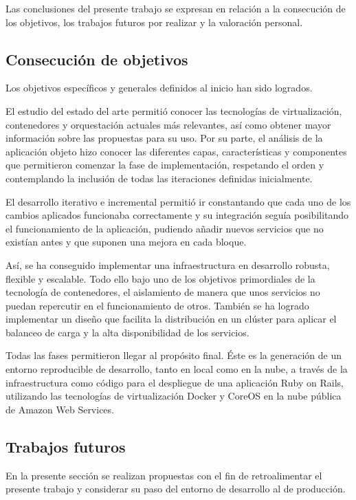 Las conclusiones del presente trabajo se expresan en relación a la consecución de los objetivos, los trabajos futuros por realizar y la valoración personal.

\subsection{Consecución de objetivos}

Los objetivos específicos y generales definidos al inicio han sido logrados.

El estudio del estado del arte permitió conocer las tecnologías de virtualización, contenedores y orquestación actuales más relevantes, así como obtener mayor información sobre las propuestas para su uso. Por su parte, el análisis de la aplicación objeto hizo conocer las diferentes capas, características y componentes que permitieron comenzar la fase de implementación, respetando el orden y contemplando la inclusión de todas las iteraciones definidas inicialmente. 

El desarrollo iterativo e incremental permitió ir constantando que cada uno de los cambios aplicados funcionaba correctamente y su integración seguía posibilitando el funcionamiento de la aplicación, pudiendo añadir nuevos servicios que no existían antes y que suponen una mejora en cada bloque.

Así, se ha conseguido implementar una infraestructura en desarrollo robusta, flexible y escalable. Todo ello bajo uno de los objetivos primordiales de la tecnología de contenedores, el aislamiento de manera que unos servicios no puedan repercutir en el funcionamiento de otros. También se ha logrado implementar un diseño que facilita la distribución en un clúster para aplicar el balanceo de carga y la alta disponibilidad de los servicios.

Todas las fases permitieron llegar al propósito final. Éste es la generación de un entorno reproducible de desarrollo, tanto en local como en la nube, a través de la infraestructura como código para el despliegue de una aplicación Ruby on Rails, utilizando las tecnologías de virtualización Docker y CoreOS en la nube pública de Amazon Web Services.

\subsection{Trabajos futuros} \label{trabajosfuturos}

En la presente sección se realizan propuestas con el fin de retroalimentar el presente trabajo y considerar su paso del entorno de desarrollo al de producción.

